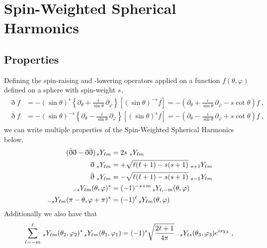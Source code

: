 
\section{Spin-Weighted Spherical Harmonics}
\label{AppendixA}

\subsection{Properties}

Defining the spin-raising and -lowering operators applied on a function $f(\theta,\varphi)$ defined on a sphere with spin-weight $s$, 
\begin{align}
	\begin{split}
		\eth f &= - (\sin{\theta})^s \left\{ \partial_\theta + \frac{i}{\sin{\theta}} \, \partial_\varphi \right\} \left[ (\sin{\theta})^{-s} f \right] 
		= - \left( \partial_\theta + \frac{i}{\sin{\theta}} \, \partial_\varphi - s \cot\theta \right) f ~, \\
		\bar{\eth} f &= - (\sin{\theta})^{-s} \left\{ \partial_\theta - \frac{i}{\sin{\theta}} \, \partial_\varphi \right\} \left[ (\sin{\theta})^{s} f \right]
		= - \left( \partial_\theta - \frac{i}{\sin{\theta}} \, \partial_\varphi + s \cot\theta \right) f ~,
	\end{split}
\end{align}
we can write multiple properties of the Spin-Weighted Spherical Harmonics below.
\begin{subequations}
    \begin{align}
        (\bar\eth \eth - \eth \bar{\eth} ) \uu[s]{Y}{\ell m} &= 2 s \,\uu[s]{Y}{\ell m} \\
        \eth \,\uu[s]{Y}{\ell m} &= +\sqrt{\ell(\ell+1)-s(s+1)} \,\uu[s+1]{Y}{\ell m} \\
        \bar\eth \,\uu[s]{Y}{\ell m} &= -\sqrt{\ell(\ell+1)-s(s+1)} \,\uu[s-1]{Y}{\ell m} \\
        \uu[-s]{Y}{\ell m}(\theta,\varphi)^* &= (-1)^{-s+m} \uu[s]{Y}{\ell, -m}(\theta,\varphi) \\
        \uu[-s]{Y}{\ell m}(\pi-\theta,\varphi+\pi)^* &= (-1)^{\ell} \uu[s]{Y}{\ell m}(\theta,\varphi)
    \end{align}
\end{subequations}
Additionally we also have that
\begin{subequations}[resume]
    \begin{align}
        \sum_{\ell=-m}^\ell \uu[s]{Y}{\ell m}(\theta_2,\varphi_2)^* \uu[s]{Y}{\ell m}(\theta_1,\varphi_1) = (-1)^s \sqrt{\frac{2 \ell +1 }{4 \pi}} \uu[-s]{Y}{\ell s}(\theta_3,\varphi_3) e^{i s \chi_3} ~,
    \end{align}
\end{subequations}
